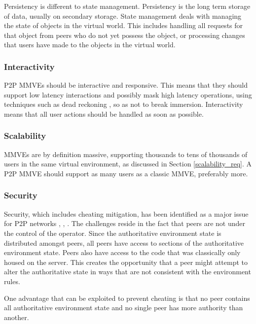Persistency is different to state management. Persistency is the long term storage of data, usually on secondary storage. State management deals with managing the state of objects in the virtual world. This includes handling all requests for that object from peers who do not yet possess the object, or processing changes that users have made to the objects in the virtual world.

\subsubsection{Interactivity}

P2P MMVEs should be interactive and responsive. This means that they should support low latency interactions and possibly mask high latency operations, using techniques such as dead reckoning \cite{cheat_proof_playout}, so as not to break immersion. Interactivity means that all user actions should be handled as soon as possible.

\subsubsection{Scalability}

MMVEs are by definition massive, supporting thousands to tens of thousands of users in the same virtual environment, as discussed in Section \ref{scalability_req}. A P2P MMVE should support as many users as a classic MMVE, preferably more.

\subsubsection{Security}

Security, which includes cheating mitigation, has been identified as a major issue for P2P networks \cite{knutsson_p2p_first}, \cite{challenges_p2p_gaming}, \cite{cheat_proof_event_ordering}. The challenges reside in the fact that peers are not under the control of the operator. Since the authoritative environment state is distributed amongst peers, all peers have access to sections of the authoritative environment state. Peers also have access to the code that was classically only housed on the server. This creates the opportunity that a peer might attempt to alter the authoritative state in ways that are not consistent with the environment rules.

One advantage that can be exploited to prevent cheating is that no peer contains all authoritative environment state and no single peer has more authority than another.

